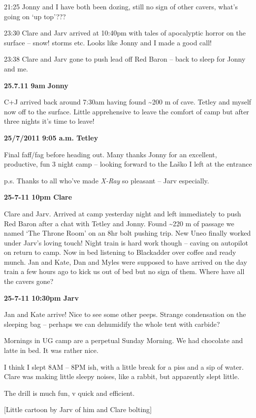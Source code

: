 21:25 Jonny and I have both been dozing, still no sign of other cavers,
what's going on `up top'???

23:30 Clare and Jarv arrived at 10:40pm with tales of apocalyptic horror
on the surface -- snow! storms etc. Looks like Jonny and I made a good
call!

23:38 Clare and Jarv gone to push lead off Red Baron -- back to sleep
for Jonny and me.

\textbf{25.7.11 9am} \textbf{Jonny}

C+J arrived back around 7:30am having found \textasciitilde 200 m of
cave. Tetley and myself now off to the surface. Little apprehensive to
leave the comfort of camp but after three nights it's time to leave!

\textbf{25/7/2011 9:05 a.m. Tetley}

Final faff/fag before heading out. Many thanks Jonny for an excellent,
productive, fun 3 night camp -- looking forward to the Laško I left at
the entrance

p.s. Thanks to all who've made \emph{X-Ray} so pleasant -- Jarv
especially.

\textbf{25-7-11 10pm Clare}

Clare and Jarv. Arrived at camp yesterday night and left immediately to
push Red Baron after a chat with Tetley and Jonny. Found
\textasciitilde 220 m of passage we named `The Throne Room' on an 8hr
bolt pushing trip. New Uneo finally worked under Jarv's loving touch!
Night train is hard work though -- caving on autopilot on return to
camp. Now in bed listening to Blackadder over coffee and ready munch.
Jan and Kate, Dan and Myles were supposed to have arrived on the day
train a few hours ago to kick us out of bed but no sign of them. Where
have all the cavers gone?

\textbf{25-7-11 10:30pm Jarv}

Jan and Kate arrive! Nice to see some other peeps. Strange condensation
on the sleeping bag -- perhaps we can dehumidify the whole tent with
carbide?

Mornings in UG camp are a perpetual Sunday Morning. We had chocolate and
latte in bed. It was rather nice.

I think I slept 8AM -- 8PM ish, with a little break for a piss and a sip
of water. Clare was making little sleepy noises, like a rabbit, but
apparently slept little.

The drill is much fun, v quick and efficient.

{[}Little cartoon by Jarv of him and Clare bolting{]}

